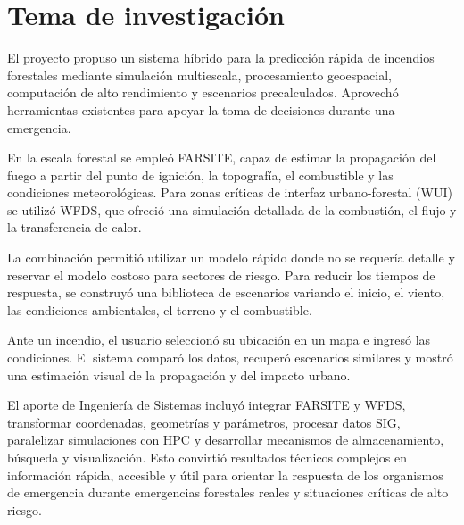 \clearpage
\section{Tema de investigación}

El proyecto propuso un sistema híbrido para la predicción rápida de incendios forestales mediante simulación multiescala, procesamiento geoespacial, computación de alto rendimiento y escenarios precalculados. Aprovechó herramientas existentes para apoyar la toma de decisiones durante una emergencia.

En la escala forestal se empleó FARSITE, capaz de estimar la propagación del fuego a partir del punto de ignición, la topografía, el combustible y las condiciones meteorológicas. Para zonas críticas de interfaz urbano-forestal (WUI) se utilizó WFDS, que ofreció una simulación detallada de la combustión, el flujo y la transferencia de calor.

La combinación permitió utilizar un modelo rápido donde no se requería detalle y reservar el modelo costoso para sectores de riesgo. Para reducir los tiempos de respuesta, se construyó una biblioteca de escenarios variando el inicio, el viento, las condiciones ambientales, el terreno y el combustible.

Ante un incendio, el usuario seleccionó su ubicación en un mapa e ingresó las condiciones. El sistema comparó los datos, recuperó escenarios similares y mostró una estimación visual de la propagación y del impacto urbano.

El aporte de Ingeniería de Sistemas incluyó integrar FARSITE y WFDS, transformar coordenadas, geometrías y parámetros, procesar datos SIG, paralelizar simulaciones con HPC y desarrollar mecanismos de almacenamiento, búsqueda y visualización. Esto convirtió resultados técnicos complejos en información rápida, accesible y útil para orientar la respuesta de los organismos de emergencia durante emergencias forestales reales y situaciones críticas de alto riesgo.
